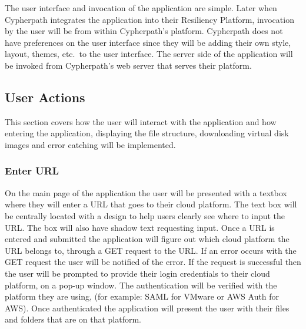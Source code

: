\documentclass{article}
\begin{document}
        The user interface and invocation of the application are simple. Later when Cypherpath integrates the application into their Resiliency Platform, invocation by the user will be from within Cypherpath's
        platform. Cypherpath does not have preferences on the user interface since they will be adding their own style, layout, themes, etc.\ to the user interface. The server side of the application will be invoked
        from Cypherpath's web server that serves their platform.


        \subsection{User Actions}
        This section covers how the user will interact with the application and how entering the application, displaying the file structure, downloading virtual disk images and error catching 
        will be implemented.

            \subsubsection{Enter URL}
            On the main page of the application the user will be presented with a textbox where they will enter a URL that goes to their cloud platform. The text box will be centrally located with a design to
            help users clearly see where to input the URL. The box will also have shadow text requesting input. Once a URL is entered and submitted the application will figure out which cloud platform the URL
            belongs to, through a GET request to the URL. If an error occurs with the GET request the user will be notified of the error. If the request is successful then the user will be prompted to
            provide their login credentials to their cloud platform, on a pop-up window. The authentication will be verified with the platform they are using, (for example: SAML for VMware or AWS Auth for AWS).
            Once authenticated the application will present the user with their files and folders that are on that platform.
            
\end{document}

